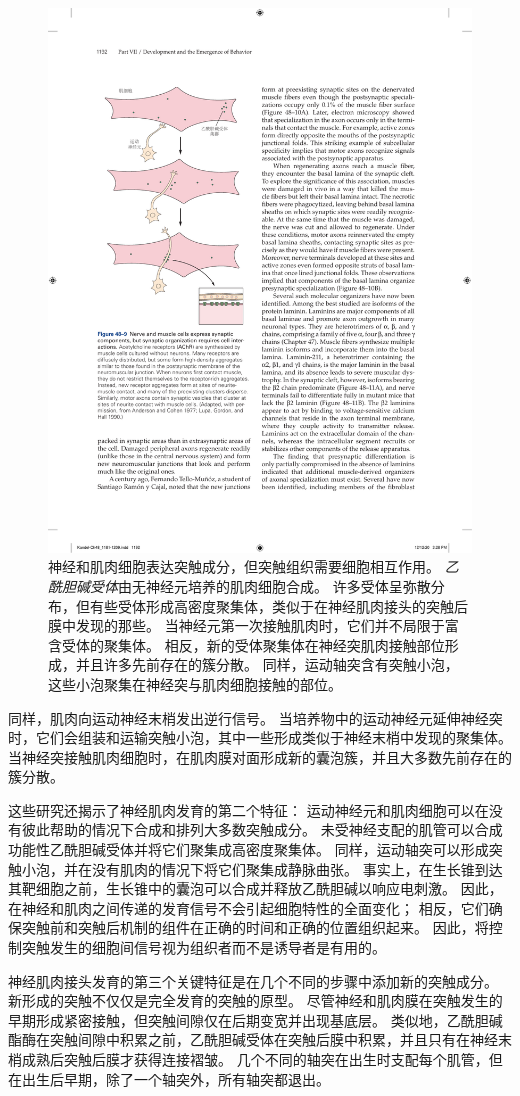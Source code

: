 \begin{figure}[htbp]
	\centering
	\includegraphics[width=0.5\linewidth]{chap48/fig_48_9}
	\caption{神经和肌肉细胞表达突触成分，但突触组织需要细胞相互作用。
		\textit{乙酰胆碱受体}由无神经元培养的肌肉细胞合成。
		许多受体呈弥散分布，但有些受体形成高密度聚集体，类似于在神经肌肉接头的突触后膜中发现的那些。
		当神经元第一次接触肌肉时，它们并不局限于富含受体的聚集体。
		相反，新的受体聚集体在神经突肌肉接触部位形成，并且许多先前存在的簇分散。
		同样，运动轴突含有突触小泡，这些小泡聚集在神经突与肌肉细胞接触的部位\cite{anderson1977nerve,lupa1990specific}。}
	\label{fig:48_9}
\end{figure}


同样，肌肉向运动神经末梢发出逆行信号。
当培养物中的运动神经元延伸神经突时，它们会组装和运输突触小泡，其中一些形成类似于神经末梢中发现的聚集体。
当神经突接触肌肉细胞时，在肌肉膜对面形成新的囊泡簇，并且大多数先前存在的簇分散。


这些研究还揭示了神经肌肉发育的第二个特征：
运动神经元和肌肉细胞可以在没有彼此帮助的情况下合成和排列大多数突触成分。
未受神经支配的肌管可以合成功能性乙酰胆碱受体并将它们聚集成高密度聚集体。
同样，运动轴突可以形成突触小泡，并在没有肌肉的情况下将它们聚集成静脉曲张。
事实上，在生长锥到达其靶细胞之前，生长锥中的囊泡可以合成并释放乙酰胆碱以响应电刺激。
因此，在神经和肌肉之间传递的发育信号不会引起细胞特性的全面变化；
相反，它们确保突触前和突触后机制的组件在正确的时间和正确的位置组织起来。
因此，将控制突触发生的细胞间信号视为组织者而不是诱导者是有用的。


神经肌肉接头发育的第三个关键特征是在几个不同的步骤中添加新的突触成分。
新形成的突触不仅仅是完全发育的突触的原型。
尽管神经和肌肉膜在突触发生的早期形成紧密接触，但突触间隙仅在后期变宽并出现基底层。
类似地，乙酰胆碱酯酶在突触间隙中积累之前，乙酰胆碱受体在突触后膜中积累，并且只有在神经末梢成熟后突触后膜才获得连接褶皱。
几个不同的轴突在出生时支配每个肌管，但在出生后早期，除了一个轴突外，所有轴突都退出。


